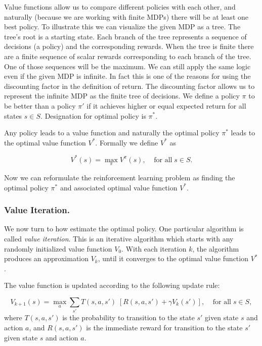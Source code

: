 Value functions allow us to compare different policies with each other, and naturally (because we are working with finite MDPs) there will be at least one best policy. To illustrate this we can visualize the given MDP as a tree. The tree's root is a starting state. Each branch of the tree represents a sequence of decisions (a policy) and the corresponding rewards. When the tree is finite there are a finite sequence of scalar rewards corresponding to each branch of the tree. One of those sequences will be the maximum. We can still apply the same logic even if the given MDP is infinite. In fact this is one of the reasons for using the discounting factor in the definition of return. The discounting factor allows us to represent the infinite MDP as the finite tree of decisions. We define a policy $\pi$ to be better than a policy $\pi'$ if it achieves higher or equal expected return for all states $s \in S $. Designation for optimal policy is $ \pi^{*} $.

Any policy leads to a value function and naturally the optimal policy $ \pi^{*} $ leads to the optimal value function $ V^{*} $. Formally we define $ V^{*} $ as

$$ V^{*}(s) = \max_{\pi}V^{\pi}(s), \;\;\;\;\text{for all}\; s \in S. $$

Now we can reformulate the reinforcement learning problem as finding the optimal policy $ \pi^{*} $ and associated optimal value function $ V^{*} $.

\subsubsection{Value Iteration.}

We now turn to how estimate the optimal policy. One particular algorithm is called \textit{value iteration}. This is an iterative algorithm which starts with any randomly initialized value function $V_{0}$. With each iteration $k$, the algorithm produces an approximation $V_{k}$, until it converges to the optimal value function $V^{*}$.

The value function is updated according to the following update rule:

$$ V_{k+1}(s) = \max_{a}\displaystyle\sum_{s'}T(s,a,s')\;[R(s,a,s')+\gamma V_{k}(s')], \;\;\;\;\text{for all}\; s \in S, $$
where $ T(s,a,s') $ is the probability to transition to the state $s'$ given state $s$ and action $a$, and $ R(s,a,s') $ is the immediate reward for transition to the state $s'$ given state $s$ and action $a$.

